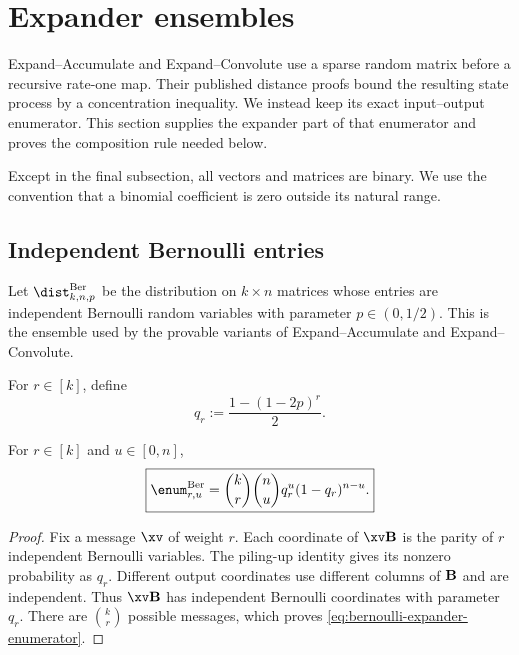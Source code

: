 
\section{Expander ensembles}
\label{sec:expander-enumerators}

Expand--Accumulate and Expand--Convolute use a sparse random matrix before a
recursive rate-one map.  Their published distance proofs bound the resulting
state process by a concentration inequality.  We instead keep its exact
input--output enumerator.  This section supplies the expander part of that
enumerator and proves the composition rule needed below.

Except in the final subsection, all vectors and matrices are binary.  We use the
convention that a binomial coefficient is zero outside its natural range.

\subsection{Independent Bernoulli entries}

Let $\dist^{\mathrm{Ber}}_{k,n,p}$ be the distribution on $k\times n$ matrices
whose entries are independent Bernoulli random variables with parameter
$p\in(0,1/2)$.  This is the ensemble used by the provable variants of
Expand--Accumulate and Expand--Convolute.

For $r\in[k]$, define
\begin{equation}
 q_r:=\frac{1-(1-2p)^r}{2}.
 \label{eq:bernoulli-expander-parity}
\end{equation}

\begin{lemma}
\label{lem:bernoulli-expander-enumerator}
For $r\in[k]$ and $u\in[0,n]$,
\begin{equation}
 \boxed{
 \enum^{\mathrm{Ber}}_{r,u}
   =
 \binom{k}{r}\binom{n}{u}q_r^u(1-q_r)^{n-u}.
 }
 \label{eq:bernoulli-expander-enumerator}
\end{equation}
\end{lemma}

\begin{proof}
Fix a message $\xv$ of weight $r$.  Each coordinate of $\xv\B$ is the parity
of $r$ independent Bernoulli variables.  The piling-up identity gives its
nonzero probability as $q_r$.  Different output coordinates use different
columns of $\mathbf B$ and are independent.  Thus $\xv\B$ has independent Bernoulli
coordinates with parameter $q_r$.  There are $\binom{k}{r}$ possible messages,
which proves \eqref{eq:bernoulli-expander-enumerator}.
\end{proof}

